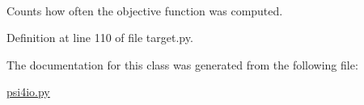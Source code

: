 \hypertarget{classforcebalance_1_1target_1_1Target_ad4cd0ab38d8fc97d3e7a6e22ce130a16}{
\paragraph[{xct}]{}}\label{classforcebalance_1_1target_1_1Target_ad4cd0ab38d8fc97d3e7a6e22ce130a16}


\-Counts how often the objective function was computed. 



\-Definition at line 110 of file target.\-py.



\-The documentation for this class was generated from the following file\-:\begin{DoxyCompactItemize}
\item 
\hyperlink{psi4io_8py}{psi4io.\-py}\end{DoxyCompactItemize}
